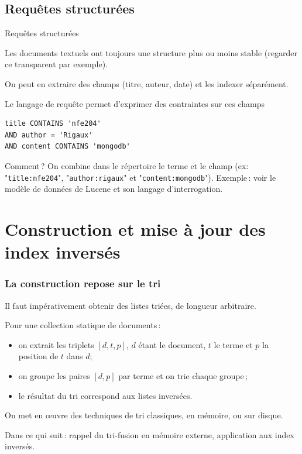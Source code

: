 \subsection{Requêtes structurées}


\begin{frame}[fragile]{Requêtes structurées}

Les documents textuels ont toujours une structure plus ou moins stable (regarder ce transparent par exemple).

\vfill

On peut en extraire des \alert{champs} (titre, auteur, date) et les indexer séparément.

\vfill

Le langage de requête permet d'exprimer des contraintes sur ces champs

\medskip

\begin{verbatim}
title CONTAINS 'nfe204'
AND author = 'Rigaux'
AND content CONTAINS 'mongodb'
\end{verbatim}

\vfill

Comment\,? On combine dans le répertoire le terme et le champ (ex: "\texttt{title:nfe204}", "\texttt{author:rigaux}" et 
"\texttt{content:mongodb}").
\vfill
Exemple\,: voir le modèle de données de Lucene et son langage d'interrogation.
\end{frame}

\section{Construction et mise à jour des index inversés}

\begin{frame}
\frametitle{La construction repose sur le \alert{tri}}

Il faut impérativement obtenir des listes triées, de longueur arbitraire. 

\vfill

Pour une collection \alert{statique} de documents\,: 

\begin{itemize}
  \item on extrait les triplets $[d, t, p]$, $d$ étant le document, $t$ le terme et $p$ la position de $t$ dans $d$;

   \item on groupe  les paires $[d, p]$ par terme et on trie chaque groupe\,; 
   
   \item le résultat du tri correspond aux listes inversées.
\end{itemize}

\medskip

On met en {\oe}uvre des techniques de tri classiques, en mémoire, ou sur disque.

\medskip

Dans ce qui suit\,: rappel du tri-fusion en mémoire externe, application aux index inversés.
\end{frame}


